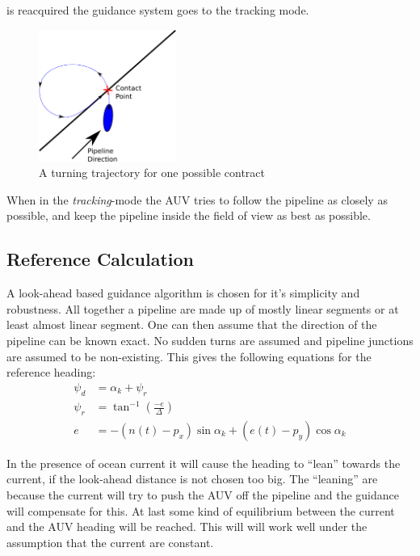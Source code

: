	is reacquired the guidance system goes to the tracking mode.
	\begin{figure}[htbp]
		\centering
		\includegraphics[width=0.4\textwidth]{pics/contact_trajectory}
		\caption{A turning trajectory for one possible contract}
		\label{fig:ch2-turning-trajectory}
	\end{figure}
	
	When in the \textit{tracking}-mode the AUV tries to follow the pipeline as closely as possible, and
	keep the pipeline inside the field of view as best as possible.

	\subsection{Reference Calculation}
		A look-ahead based guidance algorithm is chosen for it's simplicity and robustness. All
		together a pipeline are made up of mostly linear segments or at least almost linear
		segment. One can then assume that the direction of the pipeline can be known exact.
		No sudden turns are assumed and pipeline junctions are assumed to be non-existing. This gives
		the following equations for the reference heading:
		\begin{align}
			\psi_d &= \alpha_k + \psi_r \\
			\psi_r &= \tan^{-1} \left( \frac{-e}{\Delta} \right)\\
			e &= -(n(t) - p_x)\sin\alpha_k + (e(t) - p_y) \cos\alpha_k
		\end{align}
		
		In the presence of ocean current it will cause the heading to ``lean'' towards the current, if
		the look-ahead distance is not chosen too big. The ``leaning'' are because the current will try to
		push the AUV off the pipeline and the guidance will compensate for this. At last some kind of
		equilibrium between the current and the AUV heading will be reached. This will will work well under the
		assumption that	the current are constant.
		
	
